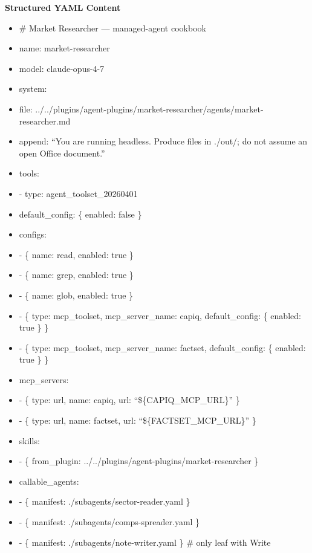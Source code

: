 \documentclass[11pt]{article}
\begin{document}
\textbf{Structured YAML Content}
\begin{itemize}[leftmargin=*,itemsep=2pt,topsep=2pt]
\item {} \# Market Researcher — managed-agent cookbook
\item {} name: market-researcher
\item {} model: claude-opus-4-7
\item {} system:
\item {} file: ../../plugins/agent-plugins/market-researcher/agents/market-researcher.md
\item {} append: ``You are running headless. Produce files in ./out/; do not assume an open Office document.''
\item {} tools:
\item {} - type: agent\_\allowbreak{}toolset\_\allowbreak{}20260401
\item {} default\_\allowbreak{}config: \{ enabled: false \}
\item {} configs:
\item {} - \{ name: read, enabled: true \}
\item {} - \{ name: grep, enabled: true \}
\item {} - \{ name: glob, enabled: true \}
\item {} - \{ type: mcp\_\allowbreak{}toolset, mcp\_\allowbreak{}server\_\allowbreak{}name: capiq, default\_\allowbreak{}config: \{ enabled: true \} \}
\item {} - \{ type: mcp\_\allowbreak{}toolset, mcp\_\allowbreak{}server\_\allowbreak{}name: factset, default\_\allowbreak{}config: \{ enabled: true \} \}
\item {} mcp\_\allowbreak{}servers:
\item {} - \{ type: url, name: capiq, url: ``\$\{CAPIQ\_\allowbreak{}MCP\_\allowbreak{}URL\}'' \}
\item {} - \{ type: url, name: factset, url: ``\$\{FACTSET\_\allowbreak{}MCP\_\allowbreak{}URL\}'' \}
\item {} skills:
\item {} - \{ from\_\allowbreak{}plugin: ../../plugins/agent-plugins/market-researcher \}
\item {} callable\_\allowbreak{}agents:
\item {} - \{ manifest: ./subagents/sector-reader.yaml \}
\item {} - \{ manifest: ./subagents/comps-spreader.yaml \}
\item {} - \{ manifest: ./subagents/note-writer.yaml \} \# only leaf with Write
\end{itemize}
\end{document}

